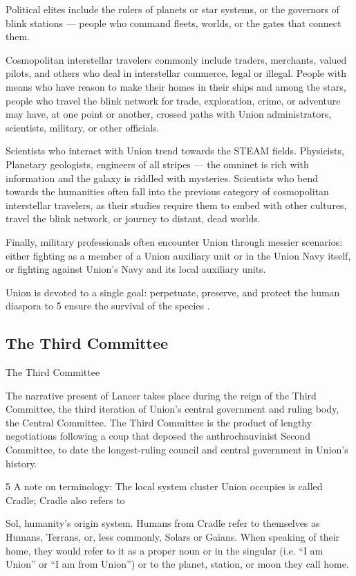 Political elites include the rulers of planets or star systems, or the governors of blink stations —
people who command fleets, worlds, or the gates that connect them.


Cosmopolitan interstellar travelers commonly include traders, merchants, valued pilots, and
others who deal in interstellar commerce, legal or illegal. People with means who have reason to
make their homes in their ships and among the stars, people who travel the blink network for
trade, exploration, crime, or adventure may have, at one point or another, crossed paths with
Union administrators, scientists, military, or other officials.


Scientists who interact with Union trend towards the STEAM fields. Physicists, Planetary
geologists, engineers of all stripes — the omninet is rich with information and the galaxy is
riddled with mysteries. Scientists who bend towards the humanities often fall into the previous
category of cosmopolitan interstellar travelers, as their studies require them to embed with other
cultures, travel the blink network, or journey to distant, dead worlds.


Finally, military professionals often encounter Union through messier scenarios: either fighting as
a member of a Union auxiliary unit or in the Union Navy itself, or fighting against Union’s Navy
and its local auxiliary units.


Union is devoted to a single goal: perpetuate, preserve, and protect the human diaspora to
                                        5
ensure the survival of the species  .

\subsection{The Third Committee}
The Third Committee

The narrative present of Lancer takes place during the reign of the Third Committee, the third
iteration of Union’s central government and ruling body, the Central Committee. The Third
Committee is the product of lengthy negotiations following a coup that deposed the
anthrochauvinist Second Committee, to date the longest-ruling council and central government in
Union’s history.

5 A note on terminology: The local system cluster Union occupies is called Cradle; Cradle also refers to

Sol, humanity’s origin system. Humans from Cradle refer to themselves as Humans, Terrans, or, less
commonly, Solars or Gaians. When speaking of their home, they would refer to it as a proper noun or in the
singular (i.e. “I am Union” or “I am from Union”) or to the planet, station, or moon they call home.




